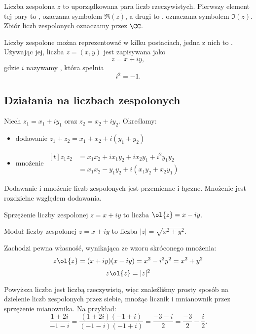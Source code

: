 \begin{definition}
    Liczba zespolona $z$ to uporządkowana para liczb rzeczywistych. Pierwszy element tej pary to , ozaczana symbolem $\Re(z)$, a drugi to , oznaczana symbolem $\Im(z)$. Zbiór liczb zespolonych oznaczamy przez $\CC$.
\end{definition}

Liczby zespolone można reprezentować w kilku postaciach, jedna z nich to . Używając jej, liczba $z = (x, y)$ jest zapisywana jako
$$ z = x + iy, $$
gdzie $i$ nazywamy , która spełnia
$$ i^2 = -1. $$

\subsection{Działania na liczbach zespolonych}
Niech $z_1 = x_1 + iy_1$ oraz $z_2 = x_2 + iy_2$. Określamy:
\begin{itemize}
    \item dodawanie $z_1 + z_2 = x_1 + x_2 + i(y_1 + y_2)$
    \item mnożenie $\begin{aligned}[t] z_1z_2 &= x_1x_2 + ix_1y_2 + ix_2y_1 + i^2y_1y_2 \\ &= x_1x_2 - y_1y_2 + i(x_1y_2 + x_2y_1)\end{aligned}$
\end{itemize}

\begin{corollary}
    Dodawanie i mnożenie liczb zespolonych jest przemienne i łączne. Mnożenie jest rozdzielne względem dodawania.
\end{corollary}

\begin{definition}
    Sprzężenie liczby zespolonej $z = x + iy$ to liczba $\ol{z} = x - iy$.
\end{definition}

\begin{definition}
    \label{d:magnitude}
    Moduł liczby zespolonej $z = x + iy$ to liczba $|z| = \sqrt{x^2 + y^2}$.
\end{definition}

Zachodzi pewna własność, wynikająca ze wzoru skróconego mnożenia:
$$ z\ol{z} = (x + iy)(x - iy) = x^2 - i^2y^2 = x^2 + y^2 $$
\begin{equation}
    z\ol{z} = |z|^2
\end{equation}

Powyższa liczba jest liczbą rzeczywistą, więc znaleźliśmy prosty sposób na dzielenie liczb zespolonych przez siebie, mnożąc licznik i mnianownik przez sprzężenie mianownika. Na przykład:
$$ \frac{1 + 2i}{-1 - i} = \frac{(1 + 2i)(-1 + i)}{(-1 - i)(-1 + i)} = \frac{-3 -i}{2} = \frac{-3}{2} - \frac{i}{2}. $$

